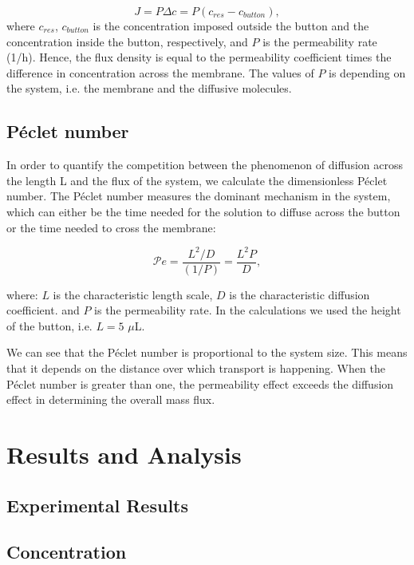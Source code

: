 \documentclass[11ptm,oneside,a4paper]{report}
\begin{document}
\begin{equation} \label{flux}
    J = P\Delta c = P(c_{res} - c_{button}), 
\end{equation} 
where $c_{res}$, $c_{button}$ is the concentration imposed outside the 
button and the concentration inside the button, respectively, 
and $P$ is the permeability rate (1/h).
Hence, the flux density is equal to the permeability coefficient times the difference in concentration across the membrane. The values of $P$ 
is depending on the system, i.e. 
the membrane and the diffusive molecules. 


\subsection*{P\'{e}clet number}


In order to quantify the competition between
the phenomenon of diffusion across the length L and the flux of the system, we calculate the dimensionless P\'{e}clet number. The 
P\'{e}clet number measures the dominant mechanism in the system, which can 
either be the time needed for the solution to diffuse across the button or 
the time needed to cross the membrane:

\begin{equation}
    \mathcal{P }e = \frac{L^2/D}{(1/P)} = \frac{L^2 P}{D},
\end{equation} 

where: $L$ is the characteristic length scale, $D$ is the characteristic diffusion coefficient. and $P$ is the permeability rate. In the calculations we used the height of the button, i.e. $L = 5$ $\mu$L.  


We can see that the P\'{e}clet number is proportional to the system size. This means that it depends on the distance over which transport is happening. 
When the P\'{e}clet number is greater than one, the permeability effect exceeds the diffusion effect in determining the overall mass flux. 


\section{Results and Analysis}

\subsection{Experimental Results}

\subsection*{Concentration}
\end{document}
